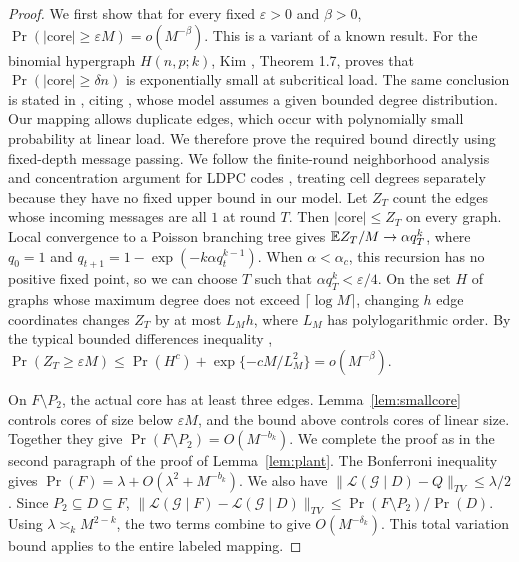 \begin{proof}
We first show that for every fixed $\varepsilon>0$ and $\beta>0$, $\Pr(|\mathrm{core}|\ge\varepsilon M)=o(M^{-\beta})$. This is a variant of a known result. For the binomial hypergraph $H(n,p;k)$, Kim \cite{kim2008poisson}, Theorem 1.7, proves that $\Pr(|\mathrm{core}|\ge\delta n)$ is exponentially small at subcritical load. The same conclusion is stated in \cite{gm}, citing \cite{dn08}, whose model assumes a given bounded degree distribution. Our mapping allows duplicate edges, which occur with polynomially small probability at linear load. We therefore prove the required bound directly using fixed-depth message passing. We follow the finite-round neighborhood analysis and concentration argument for LDPC codes \cite[Theorem~2]{richardson2001capacity}, treating cell degrees separately because they have no fixed upper bound in our model. Let $Z_T$ count the edges whose incoming messages are all $1$ at round $T$. Then $|\mathrm{core}|\le Z_T$ on every graph. Local convergence to a Poisson branching tree gives $\mathbb E Z_T/M\to\alpha q_T^k$, where $q_0=1$ and $q_{t+1}=1-\exp(-k\alpha q_t^{k-1})$. When $\alpha<\alpha_c$, this recursion has no positive fixed point, so we can choose $T$ such that $\alpha q_T^k<\varepsilon/4$. On the set $H$ of graphs whose maximum degree does not exceed $\lceil\log M\rceil$, changing $h$ edge coordinates changes $Z_T$ by at most $L_Mh$, where $L_M$ has polylogarithmic order. By the typical bounded differences inequality \cite[Proposition~2]{combes2015mcdiarmid}, $\Pr(Z_T\ge\varepsilon M)\le\Pr(H^c)+\exp\{-cM/L_M^2\}=o(M^{-\beta})$.

On $F\setminus P_2$, the actual core has at least three edges. Lemma~\ref{lem:smallcore} controls cores of size below $\varepsilon M$, and the bound above controls cores of linear size. Together they give $\Pr(F\setminus P_2)=O(M^{-b_k})$. We complete the proof as in the second paragraph of the proof of Lemma~\ref{lem:plant}. The Bonferroni inequality gives $\Pr(F)=\lambda+O(\lambda^2+M^{-b_k})$. We also have $\|\mathcal L(\mathcal G\mid D)-Q\|_{TV}\le\lambda/2$. Since $P_2\subseteq D\subseteq F$, $\|\mathcal L(\mathcal G\mid F)-\mathcal L(\mathcal G\mid D)\|_{TV}\le\Pr(F\setminus P_2)/\Pr(D)$. Using $\lambda\asymp_kM^{2-k}$, the two terms combine to give $O(M^{-\delta_k})$. This total variation bound applies to the entire labeled mapping.
\end{proof}


